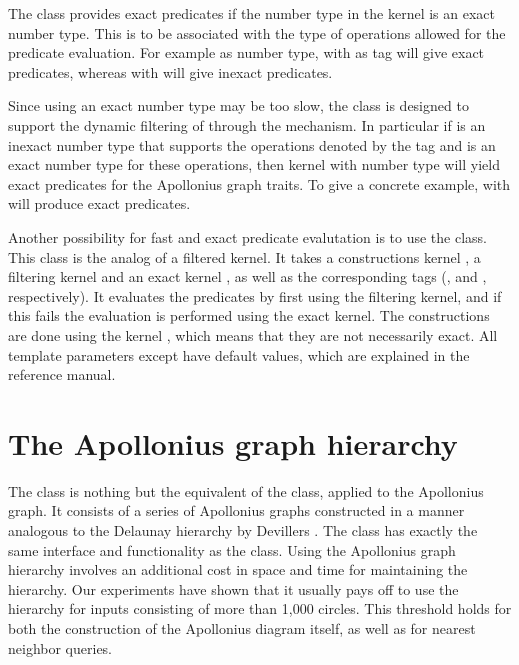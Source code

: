 The  class provides exact
predicates if the number type in the kernel  is an exact number
type. This is to be associated with the type of operations allowed for
the predicate evaluation. For example  as number
type, with  as tag will give exact predicates,
whereas  with  will give
inexact predicates.

Since using an exact number type may be too slow, the
 class is designed to
support the dynamic filtering of \cgal{} through the
 mechanism. In particular if  is an
inexact number type that supports the operations denoted by the tag
 and  is an exact number type for these
operations, then kernel with number type 
will yield exact predicates for the Apollonius graph traits. To give a
concrete example,  with
 will produce exact predicates.

Another possibility for fast and exact predicate evalutation is to use
the
class. This class is the analog of a filtered kernel. It takes a
constructions kernel , a filtering kernel  and an
exact kernel , as well as the corresponding tags
(,  and , respectively).
It evaluates the predicates by first using the filtering kernel, and
if this fails the evaluation is performed using the exact kernel. The
constructions are done using the kernel , which means that
they are not necessarily exact. All template parameters except
 have default values, which are explained in the reference
manual.



\section{The Apollonius graph hierarchy}
\label{sec:apollonius2-hierarchy}

The  class is nothing but the equivalent of the 
class, applied to the Apollonius graph. It consists of a series of
Apollonius graphs constructed in a manner analogous to the Delaunay
hierarchy by Devillers \cite{d-iirdt-98}. The class
has exactly the same interface and functionality as the
class. Using the Apollonius graph hierarchy involves an additional
cost in space and time for maintaining the hierarchy. Our experiments
have shown that it usually pays off to use the hierarchy for inputs
consisting of more than 1,000 circles. This threshold holds for both
the construction of the Apollonius diagram itself, as well as for
nearest neighbor queries.

